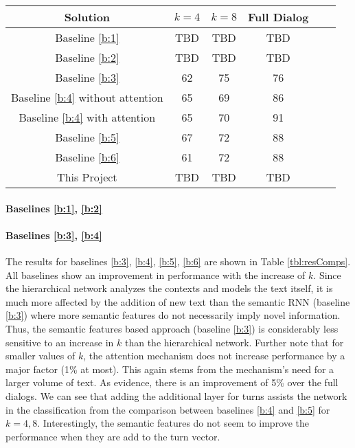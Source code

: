 \begin{table*}[!htb]
    \centering\small
    \begin{tabular}{| c | c | c | c | l | l |}
        \hline \textbf{Solution} & \textbf{$k=4$} & \textbf{$k=8$} & \textbf{Full Dialog} \\
        \hline Baseline \ref{b:1} & TBD & TBD & TBD \\
        \hline Baseline \ref{b:2} & TBD & TBD & TBD \\
        \hline Baseline \ref{b:3} & 62 & 75 & 76 \\
        \hline Baseline \ref{b:4} without attention  & 65 & 69 & 86 \\
        \hline Baseline \ref{b:4} with attention  & 65 & 70 & 91 \\
        \hline Baseline \ref{b:5} & 67 & 72 & 88 \\
        \hline Baseline \ref{b:6} & 61 & 72 & 88 \\
        \hline This Project & TBD & TBD & TBD \\
        \hline
    \end{tabular}
    \caption{Precision in Dialog-End Classification}\label{tbl:resComps}
\end{table*}


\paragraph*{Baselines \ref{b:1}, \ref{b:2}}





\paragraph*{Baselines \ref{b:3}, \ref{b:4}}
The results for baselines \ref{b:3}, \ref{b:4}, \ref{b:5}, \ref{b:6} are shown in Table \ref{tbl:resComps}. 
All baselines show an improvement in performance with the increase of $k$. 
Since the hierarchical network analyzes the contexts and models the text itself, 
it is much more affected by the addition of new text than the semantic RNN (baseline \ref{b:3}) where more semantic features 
do not necessarily imply novel information. 
Thus, the semantic features based approach (baseline \ref{b:3}) is considerably 
less sensitive to an increase in $k$ than the hierarchical network. 
Further note that for smaller values of $k$, the attention mechanism 
does not increase performance by a major factor (1\% at most). This again stems from 
the mechanism's need for a larger volume of text. As evidence, there is 
an improvement of 5\% over the full dialogs. 
We can see that adding the additional layer for turns assists the network in the 
classification from the comparison between baselines \ref{b:4} and \ref{b:5} for $k=4,8$. 
Interestingly, the semantic features do not seem to improve the performance 
when they are add to the turn vector.
